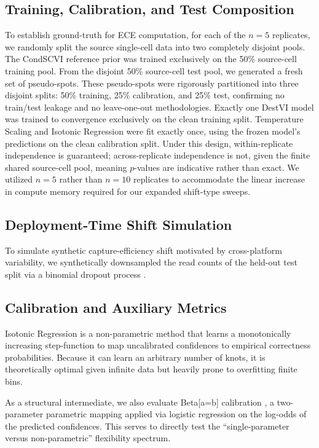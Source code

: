 \documentclass{jmlr} %
\begin{document}
\subsection{Training, Calibration, and Test Composition}
To establish ground-truth for ECE computation, for each of the $n=5$ replicates, we randomly split the source single-cell data into two completely disjoint pools. The CondSCVI reference prior was trained exclusively on the 50\% source-cell training pool. From the disjoint 50\% source-cell test pool, we generated a fresh set of pseudo-spots. These pseudo-spots were rigorously partitioned into three disjoint splits: 50\% training, 25\% calibration, and 25\% test, confirming no train/test leakage and no leave-one-out methodologies. Exactly one DestVI model was trained to convergence exclusively on the clean training split. Temperature Scaling and Isotonic Regression were fit exactly once, using the frozen model's predictions on the clean calibration split. Under this design, within-replicate independence is guaranteed; across-replicate independence is not, given the finite shared source-cell pool, meaning $p$-values are indicative rather than exact. We utilized $n=5$ rather than $n=10$ replicates to accommodate the linear increase in compute memory required for our expanded shift-type sweeps.

\subsection{Deployment-Time Shift Simulation}
To simulate synthetic capture-efficiency shift motivated by cross-platform variability, we synthetically downsampled the read counts of the held-out test split via a binomial dropout process \citep{townes2019feature}.

\subsection{Calibration and Auxiliary Metrics}
Isotonic Regression is a non-parametric method that learns a monotonically increasing step-function to map uncalibrated confidences to empirical correctness probabilities. Because it can learn an arbitrary number of knots, it is theoretically optimal given infinite data but heavily prone to overfitting finite bins. 

As a structural intermediate, we also evaluate Beta[a=b] calibration \citep{kull2017beta}, a two-parameter parametric mapping applied via logistic regression on the log-odds of the predicted confidences. This serves to directly test the ``single-parameter versus non-parametric'' flexibility spectrum.
\end{document}
